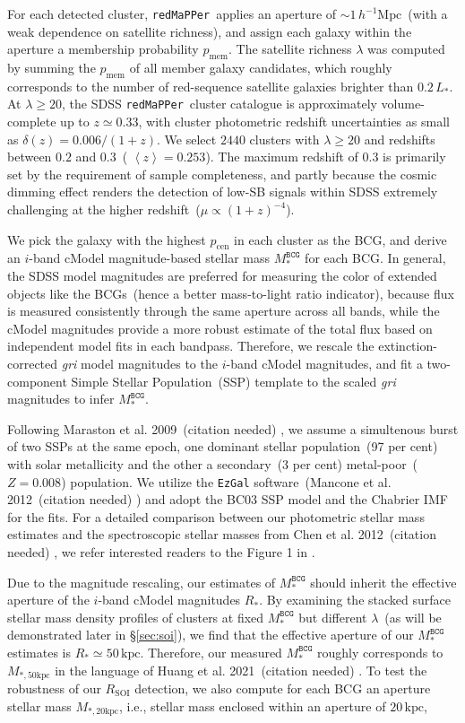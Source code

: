 \documentclass[fleqn,usenatbib]{mnras}
\newcommand{\rsoi}{R_{\mathrm{SOI}}}
\newcommand{\avg}[1]{\left\langle #1 \right\rangle}
\newcommand{\msbcg}{M_*^{\texttt{BCG}}}
\newcommand{\hmpc}{h^{-1}\mathrm{Mpc}}
\newcommand{\kpc}{\mathrm{kpc}}
\newcommand{\pcen}{p_{\mathrm{cen}}}
\newcommand{\pmem}{p_{\mathrm{mem}}}
\newcommand\xkchen[1]{{\color{cyan} {#1}}}
\newcommand*\citeme{{\color{green}(citation needed)}}
\newcommand\redmapper{\texttt{redMaPPer}}
\begin{document}
For each detected cluster, \redmapper~applies an aperture of
${\sim}1\,\hmpc$~(with a weak dependence on satellite richness), and assign
each galaxy within the aperture a membership probability $\pmem$. The
satellite richness $\lambda$ was computed by summing the $\pmem$ of all
member galaxy candidates, which roughly corresponds to the number of
red-sequence satellite galaxies brighter than $0.2\,L_*$. At
$\lambda{\geq}20$, the SDSS \redmapper~cluster catalogue is approximately
volume-complete up to $z{\simeq}0.33$, with cluster photometric redshift
uncertainties as small as $\delta(z)=0.006/(1+z)$.  We select \xkchen{$2440$}
clusters with $\lambda{\geq}20$ and redshifts between \xkchen{$0.2$} and
\xkchen{$0.3$}~(\xkchen{$\avg{z}{=}0.253$}). The maximum redshift of $0.3$ is primarily set
by the requirement of sample completeness, and partly because the cosmic
dimming effect renders the detection of low-SB signals within SDSS
extremely challenging at the higher redshift~($\mu \propto (1+z)^{-4}$).


We pick the galaxy with the highest $\pcen$ in each cluster as the BCG, and
derive an $i$-band cModel magnitude-based stellar mass $\msbcg$ for each
BCG.  In general, the SDSS model magnitudes are preferred for measuring the
color of extended objects like the BCGs~(hence a better mass-to-light ratio
indicator), because flux is measured consistently through the same aperture
across all bands, while the cModel magnitudes provide a more robust
estimate of the total flux based on independent model fits in each
bandpass. Therefore, we rescale the extinction-corrected {\it gri} model
magnitudes to the $i$-band cModel magnitudes, and fit a two-component
Simple Stellar Population~(SSP) template to the scaled {\it gri} magnitudes
to infer $\msbcg$.


Following Maraston et al. 2009~\citeme \xkchen{\citep{Maraston2009} }, we assume a simultenous burst of
two SSPs at the same epoch, one dominant stellar population~(97 per cent)
with solar metallicity and the other a secondary~(3 per cent)
metal-poor~($Z{=}0.008$) population.  We utilize the \texttt{EzGal}
software~(Mancone et al.  2012~\citeme \xkchen{\citep{Mancone2012} }) and adopt the BC03 SSP model and
the Chabrier IMF for the fits. For a detailed comparison between our
photometric stellar mass estimates and the spectroscopic stellar masses
from Chen et al. 2012~\citeme \xkchen{\citep{Chen2012} }, we refer interested readers to the Figure 1 in
.


Due to the magnitude rescaling, our estimates of $\msbcg$ should inherit
the effective aperture of the $i$-band cModel magnitudes $R_*$. By
examining the stacked surface stellar mass density profiles of clusters at
fixed $\msbcg$ but different $\lambda$~(as will be demonstrated later in
\S\ref{sec:soi}), we find that the effective aperture of our $\msbcg$
estimates is $R_*{\simeq}50\,\kpc$.  Therefore, our measured $\msbcg$
roughly corresponds to $M_{*,50\kpc}$ in the language of Huang et al.
2021~\citeme \xkchen{\citep{Huang2021} }. To test the robustness of our $\rsoi$ detection, we also
compute for each BCG an aperture stellar mass $M_{*,20\kpc}$, i.e., stellar
mass enclosed within an aperture of $20\,\kpc$,
\end{document}
